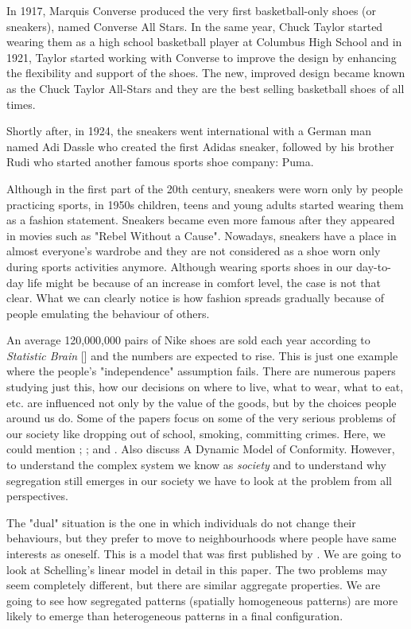 \documentclass[../main.tex]{subfiles}
\begin{document}
In 1917, Marquis Converse produced the very first basketball-only shoes (or sneakers), named Converse All Stars. In the same year, Chuck Taylor started wearing them as a high school basketball player at Columbus High School and in 1921, Taylor started working with Converse to improve the design by enhancing the flexibility and support of the shoes. The new, improved design became known as the Chuck Taylor All-Stars and they are the best selling basketball shoes of all times.

Shortly after, in 1924, the sneakers went international with a German man named Adi Dassle who created the first Adidas sneaker, followed by his brother Rudi who started another famous sports shoe company: Puma.

Although in the first part of the 20th century, sneakers were worn only by people practicing sports, in 1950s children, teens and young adults started wearing them as a fashion statement. Sneakers became even more famous after they appeared in movies such as "Rebel Without a Cause". Nowadays, sneakers have a place in almost everyone's wardrobe and they are  not considered as a shoe worn only during sports activities anymore. Although wearing sports shoes in our day-to-day life might be because of an increase in comfort level, the case is not that clear. What we can clearly notice is how fashion spreads gradually because of people emulating the behaviour of others. 

An average 120,000,000 pairs of Nike shoes are sold each year according to \textit{Statistic Brain} [\citeyear{nike}] and the numbers are expected to rise. This is just one example where the people's "independence" assumption fails. There are numerous papers studying just this, how our decisions on where to live, what to wear, what to eat, etc. are influenced not only by the value of the goods, but by the choices people around us do. Some of the papers focus on some of the very serious problems of our society like dropping out of school, smoking, committing crimes. Here, we could mention \cite[]{crane}; \cite[]{evans}; and \cite[]{akerlof}. Also \cite[]{young} discuss A Dynamic Model of Conformity. However, to understand the complex system we know as \textit{society} and to understand why segregation still emerges in our society we have to look at the problem from all perspectives.  

The "dual" situation is the one in which individuals do not change their behaviours, but they prefer to move to neighbourhoods where people have same interests as oneself. This is a model that was first published by \cite[]{schelling}. We are going to look at Schelling's linear model in detail in this paper. The two problems may seem completely different, but there are similar aggregate properties. We are going to see how segregated patterns (spatially homogeneous patterns) are more likely to emerge than heterogeneous patterns in a final configuration.
\end{document}
